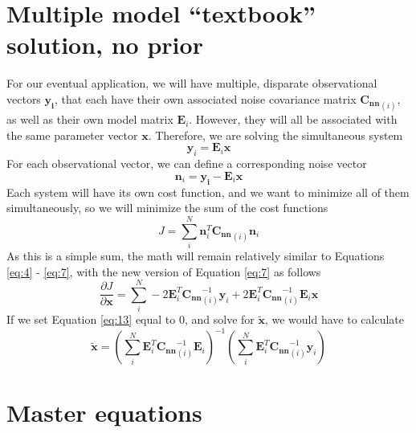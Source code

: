 \documentclass{article}
\begin{document}
\section{Multiple model ``textbook'' solution, no prior}
For our eventual application, we will have multiple, disparate observational vectors $\mathbf{y_{i}}$, that each have their own associated noise covariance matrix $\mathbf{C_{nn}}_{(i)}$, as well as their own model matrix $\mathbf{E}_i$. However, they will all be associated with the same parameter vector $\mathbf{x}$. Therefore, we are solving the simultaneous system
\begin{equation}
\label{eq:10}
\mathbf{y}_{i} = \mathbf{E}_{i}\mathbf{x}
\end{equation}
For each observational vector, we can define a corresponding noise vector
\begin{equation}
\label{eq:11}
\mathbf{n}_{i} = \mathbf{y_{i}} - \mathbf{E}_i\mathbf{x}
\end{equation}
Each system will have its own cost function, and we want to minimize all of them simultaneously, so we will minimize the sum of the cost functions
\begin{equation}
\label{eq:12}
J = \sum^{N}_{i} \mathbf{n}_{i}^T\mathbf{C_{nn}}_{(i)}\mathbf{n}_{i}
\end{equation}
As this is a simple sum, the math will remain relatively similar to Equations \ref{eq:4} - \ref{eq:7}, with the new version of Equation \ref{eq:7} as follows
\begin{equation}
\label{eq:13}
\frac{\partial J}{\partial \mathbf{x}} = \sum_{i}^{N} -2 \mathbf{E}_{i}^{T} \mathbf{C_{nn}}^{-1}_{(i)}\mathbf{y}_{i} + 2 \mathbf{E}^{T}_{i}\mathbf{C_{nn}}^{-1}_{(i)}\mathbf{E}_i\mathbf{x}
\end{equation}
If we set Equation \ref{eq:13} equal to 0, and solve for $\mathbf{\tilde{x}}$, we would have to calculate
\begin{equation}
\label{eq:14}
\mathbf{\tilde{x}} = \left(\sum_{i}^{N}\mathbf{E}^{T}_{i}\mathbf{C_{nn}}^{-1}_{(i)}\mathbf{E}_i\right)^{-1} \left(\sum_{i}^{N} \mathbf{E}_{i}^{T} \mathbf{C_{nn}}^{-1}_{(i)}\mathbf{y}_{i}\right)
\end{equation}

\section{Master equations}
\label{sec:master-equations}
\end{document}
